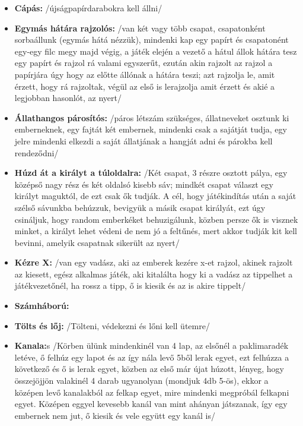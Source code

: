 \documentclass[a4paper, 12pt, twoside, openright]{article}
\begin{document}
\begin{itemize}
\item \textbf{Cápás:} /újságpapírdarabokra kell állni/

\item \textbf{Egymás hátára rajzolós:} /van két vagy több csapat, csapatonként sorbaállunk (egymás hátá nézzük), mindenki kap egy papírt és csapatonént egy-egy filc megy majd végig, a játék elején a vezető a hátul állok hátára tesz egy papírt és rajzol rá valami egyszerűt, ezután akin rajzolt az rajzol a papírjára úgy hogy az előtte állónak a hátára teszi; azt rajzolja le, amit érzett, hogy rá rajzoltak, végül az első is lerajzolja amit érzett és akié a legjobban hasonlót, az nyert/

\item \textbf{Állathangos párosítós:} /páros létszám szükséges, állatneveket osztunk ki emberneknek, egy fajtát két embernek, mindenki csak a sajátját tudja, egy jelre mindenki elkezdi a saját állatjának a hangját adni és párokba kell rendeződni/

\item \textbf{Húzd át a királyt a túloldalra:} /Két csapat, 3 részre osztott pálya, egy középső nagy rész és két oldalsó kisebb sáv; mindkét csapat választ egy királyt maguktól, de ezt csak ők tudják. A cél, hogy játékindítás után a saját szélső sávunkba behúzzuk, bevigyük a másik csapat királyát, ezt úgy csináljuk, hogy random emberkéket behuzigálunk, közben persze ők is visznek minket, a királyt lehet védeni de nem jó a feltűnés, mert akkor tudják kit kell bevinni, amelyik csapatnak sikerült az nyert/

\item \textbf{Kézre X:} /van egy vadász, aki az emberek kezére x-et rajzol, akinek rajzolt az kiesett, egész alkalmas játék, aki kitalálta hogy ki a vadász az tippelhet a játékvezetőnél, ha rossz a tipp, ő is kiesik és az is akire tippelt/

\item \textbf{Számháború:}

\item \textbf{Tölts és lőj:} /Tölteni, védekezni és lőni kell ütemre/

\item \textbf{Kanala:}s /Körben ülünk mindenkinél van 4 lap, az elsőnél a paklimaradék letéve, ő felhúz egy lapot és az így nála levő 5ből lerak egyet, ezt felhúzza a következő és ő is lerak egyet, közben az első már újat húzott, lényeg, hogy összejöjjön valakinél 4 darab ugyanolyan (mondjuk 4db  5-ös), ekkor a középen levő kanalakból az felkap egyet, mire mindenki megpróbál felkapni egyet. Középen eggyel kevesebb kanál van mint ahányan játszanak, így egy embernek nem jut, ő kiesik és vele együtt egy kanál is/


\end{itemize}
\end{document}
